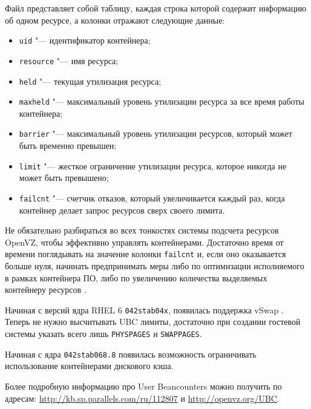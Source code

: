 Файл представляет собой таблицу, каждая строка которой содержит информацию об одном ресурсе, а колонки отражают следующие данные:
\begin{itemize}
    \item \texttt{uid} "--- идентификатор контейнера;
    \item \texttt{resource} "--- имя ресурса;
    \item \texttt{held} "--- текущая утилизация ресурса;
    \item \texttt{maxheld} "--- максимальный уровень утилизации ресурса за все время работы контейнера;
    \item \texttt{barrier} "--- максимальный уровень утилизации ресурсов, который может быть временно превышен;
    \item \texttt{limit} "--- жесткое ограничение утилизации ресурса, которое никогда не может быть превышено;
    \item \texttt{failcnt} "--- счетчик отказов, который увеличивается каждый раз, когда контейнер делает запрос ресурсов сверх своего лимита.
\end{itemize}

Не обязательно разбираться во всех тонкостях системы подсчета ресурсов OpenVZ, чтобы эффективно управлять контейнерами. 
Достаточно время от времени поглядывать на значение колонки \texttt{failcnt} и, если оно оказывается больше нуля, начинать предпринимать меры либо по оптимизации исполняемого в рамках контейнера ПО, либо по увеличению количества выделяемых контейнеру ресурсов \cite{xakep}.

Начиная с версий ядра RHEL 6 \texttt{042stab04x}, появилась поддержка vSwap \cite{ubc}.
Теперь не нужно высчитывать UBC лимиты, достаточно при создании гостевой системы указать всего лишь \texttt{PHYSPAGES} и \texttt{SWAPPAGES}.

Начиная с ядра \texttt{042stab068.8} появилась возможность ограничивать использование контейнерами дискового кэша.

Более подробную информацию про User Beancounters можно получить по адресам: \url{http://kb.sp.parallels.com/ru/112807} и \url{http://openvz.org/UBC}.

\clearpage
